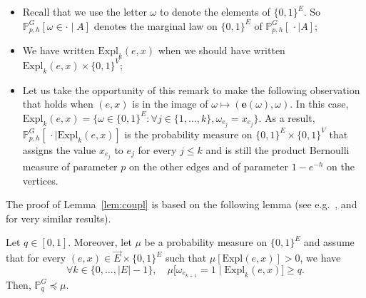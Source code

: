 \documentclass[AHL,Unicode,longabstracts,published]{cedram}
\newcommand{\Pro}{\mathbb{P}}
\newcommand{\ee}{\mathbf{e}}
\newcommand{\Expl}{\mathrm{Expl}}
\let\oldforall\forall
\renewcommand*{\forall}{\mathrel{\oldforall}}
\begin{document}
\begin{rema}\label{rk:formal}\leavevmode
\begin{itemize}
\item Recall that we use the letter $\omega$ to denote the elements of $\{0,1\}^E$. So $\Pro_{p,h}^G [\omega \in \cdot \mid A]$ denotes the marginal law on $\{0,1\}^E$ of $\Pro_{p,h}^G[\, \cdot \mid A]$;
\item We have written $\Expl_k(e,x)$ when we should have written $\Expl_k(e,x) \times \{0,1\}^V$;
\item Let us take the opportunity of this remark to make the following observation that holds when $(e,x)$ is in the image of $\omega \mapsto (\ee(\omega),\omega)$. In this case, $\Expl_k(e,x)=\{\omega \in \{0,1\}^E : \forall j \in \{1,\dots,k\}, \omega_{e_j}=x_{e_j}\}$. As a result, $\Pro_{p,h}^G [\, \cdot \mid \Expl_k(e,x)]$ is the probability measure on $\{0,1\}^E\times\{0,1\}^V$ that assigns the value $x_{e_j}$ to $e_j$ for every $j \le k$ and is still the product Bernoulli measure of parameter $p$ on the other edges and of parameter $1-e^{-h}$ on the vertices.
\end{itemize}
\end{rema}

The proof of Lemma~\ref{lem:coupl} is based on the following lemma (see e.g.~\cite[Lemma~1]{Rus82}, \cite[(7.64)]{Gri99} and~\cite[Lemma~2.1]{DRT19} for very similar results).

\begin{lemm}\label{lem:gen}
Let $q \in [0,1]$. Moreover, let $\mu$ be a probability measure on $\{0,1\}^E$ and assume that for every $(e,x) \in \vec{E}\times\{0,1\}^E$ such that $\mu[\Expl(e,x)]>0$, we have
\[
\forall k \in \{0,\dots,|E|-1\}, \quad \mu \big[\omega_{e_{k+1}} = 1 \; \big| \; \Expl_k(e,x) \big] \ge q.
\]
Then, $\Pro_q^G \preceq \mu$.
\end{lemm}
\end{document}

